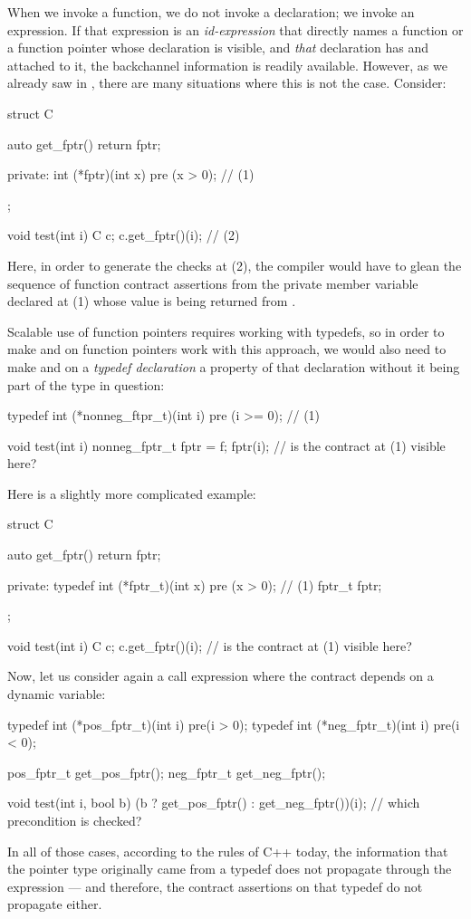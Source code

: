 When we invoke a function, we do not invoke a declaration; we invoke an expression. If that expression is an \emph{id-expression} that directly names a function or a function pointer whose declaration is visible, and \emph{that} declaration has  and  attached to it, the backchannel information is readily available. However, as we already saw in \label{intermediate}, there are many situations where this is not the case. Consider:
\begin{codeblock}
struct C {
  auto get_fptr() { return fptr; }
  
private:
  int (*fptr)(int x) pre (x > 0);  // (1)
};

void test(int i) {
  C c;
  c.get_fptr()(i);  // (2)
}
\end{codeblock}
Here, in order to generate the checks at (2), the compiler would have to glean the sequence of function contract assertions from the private member variable declared at (1) whose value is being returned from . 

Scalable use of function pointers requires working with typedefs, so in order to make  and  on function pointers work with this approach, we would also need to make  and  on a \emph{typedef declaration} a property of that declaration without it being part of the type in question:
\begin{codeblock}
typedef int (*nonneg_ftpr_t)(int i) pre (i >= 0);  // (1)

void test(int i) {
  nonneg_fptr_t fptr = f;
  fptr(i);  // is the contract at (1) visible here?
}
\end{codeblock}
Here is a slightly more complicated example:
\begin{codeblock}
struct C {
  auto get_fptr() { return fptr; }
  
private:
  typedef int (*fptr_t)(int x) pre (x > 0);  // (1)
  fptr_t fptr;
};

void test(int i) {
  C c;
  c.get_fptr()(i);  // is the contract at (1) visible here?
}
\end{codeblock}
Now, let us consider again a call expression where the contract depends on a dynamic variable:
\begin{codeblock}
typedef int (*pos_fptr_t)(int i) pre(i > 0);
typedef int (*neg_fptr_t)(int i) pre(i < 0);

pos_fptr_t get_pos_fptr();
neg_fptr_t get_neg_fptr();

void test(int i, bool b) {
  (b ? get_pos_fptr() : get_neg_fptr())(i);  // which precondition is checked?
}
\end{codeblock}
In all of those cases, according to the rules of C++ today, the information that the pointer type originally came from a typedef does not propagate through the expression --- and therefore, the contract assertions on that typedef do not propagate either.

